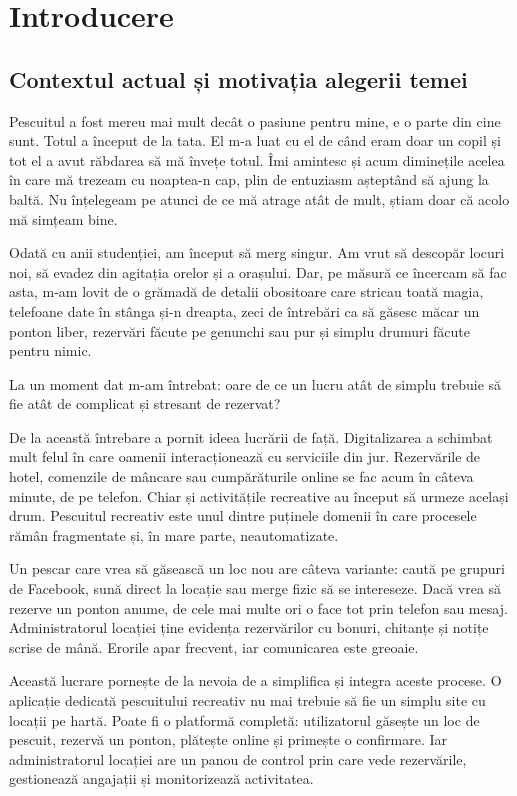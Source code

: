 ﻿\chapter{Introducere}

\section{Contextul actual și motivația alegerii temei}

Pescuitul a fost mereu mai mult decât o pasiune pentru mine, e o parte din cine sunt. Totul a început de la tata. El m-a luat cu el de când eram doar un copil și tot el a avut răbdarea să mă învețe totul. Îmi amintesc și acum diminețile acelea în care mă trezeam cu noaptea-n cap, plin de entuziasm așteptând să ajung la baltă. Nu înțelegeam pe atunci de ce mă atrage atât de mult, știam doar că acolo mă simțeam bine.

Odată cu anii studenției, am început să merg singur. Am vrut să descopăr locuri noi, să evadez din agitația orelor și a orașului. Dar, pe măsură ce încercam să fac asta, m-am lovit de o grămadă de detalii obositoare care stricau toată magia, telefoane date în stânga și-n dreapta, zeci de întrebări ca să găsesc măcar un ponton liber, rezervări făcute pe genunchi sau pur și simplu drumuri făcute pentru nimic.

La un moment dat m-am întrebat: oare de ce un lucru atât de simplu trebuie să fie atât de complicat și stresant de rezervat?

De la această întrebare a pornit ideea lucrării de față. Digitalizarea a schimbat mult felul în care oamenii interacționează cu serviciile din jur. Rezervările de hotel, comenzile de mâncare sau cumpărăturile online se fac acum în câteva minute, de pe telefon. Chiar și activitățile recreative au început să urmeze același drum. Pescuitul recreativ este unul dintre puținele domenii în care procesele rămân fragmentate și, în mare parte, neautomatizate.

Un pescar care vrea să găsească un loc nou are câteva variante: caută pe grupuri de Facebook, sună direct la locație sau merge fizic să se intereseze. Dacă vrea să rezerve un ponton anume, de cele mai multe ori o face tot prin telefon sau mesaj. Administratorul locației ține evidența rezervărilor cu bonuri, chitanțe și notițe scrise de mână. Erorile apar frecvent, iar comunicarea este greoaie.

Această lucrare pornește de la nevoia de a simplifica și integra aceste procese. O aplicație dedicată pescuitului recreativ nu mai trebuie să fie un simplu site cu locații pe hartă. Poate fi o platformă completă: utilizatorul găsește un loc de pescuit, rezervă un ponton, plătește online și primește o confirmare. Iar administratorul locației are un panou de control prin care vede rezervările, gestionează angajații și monitorizează activitatea.

